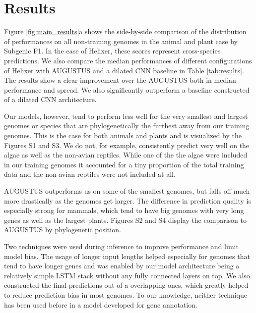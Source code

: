 \documentclass{bioinfo}
\begin{document}
\section{Results}
Figure \ref{fig:main_results}a shows the side-by-side comparison of the distribution 
of performances on all non-training genomes in the animal and plant case by Subgenic 
F1. In the case of Helixer, these scores represent cross-species predictions. We 
also compare the median performances of different configurations of Helixer with 
AUGUSTUS and a dilated CNN baseline in Table \ref{tab:results}. The results show a 
clear improvement over the AUGUSTUS both in median performance and spread. We also 
significantly outperform a baseline constructed of a dilated CNN architecture.

Our models, however, tend to perform less well for the very smallest and largest 
genomes or species that are phylogenetically the furthest away from our training 
genomes. This is the case for both animals and plants and is visualized by the 
Figures S1 and S3. We do not, for example, consistently predict very well on the 
algae as well as the non-avian reptiles. While one of the the algae were included 
in our training genomes it accounted for a tiny proportion of the total training 
data and the non-avian reptiles were not included at all.
 
AUGUSTUS outperforms us on some of the smallest genomes, but falls off much more 
drastically as the genomes get larger. The difference in prediction quality is 
especially strong for mammals, which tend to have big genomes with very long genes 
as well as the largest plants. Figures S2 and S4 display the comparison to AUGUSTUS 
by phylogenetic position.

Two techniques were used during inference to improve performance and limit model 
bias. The usage of longer input lengths helped especially for genomes that tend to 
have longer genes and was enabled by our model architecture being a relatively 
simple LSTM stack without any fully connected layers on top. We also constructed the 
final predictions out of a overlapping ones, which greatly helped to reduce 
prediction bias in most genomes. To our knowledge, neither technique has been used 
before in a model developed for gene annotation. 
\end{document}
